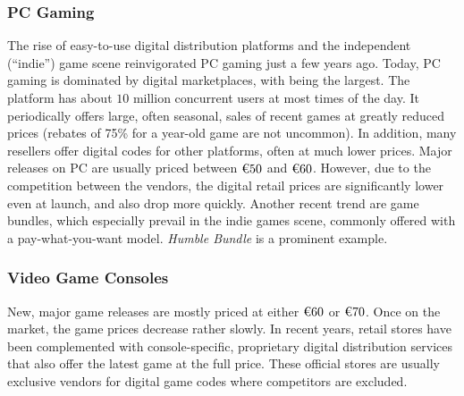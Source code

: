 \subsubsection{\gls{PC} Gaming}
\label{sec:pcgaming}

The rise of easy-to-use digital distribution platforms and the
independent (``indie'') game scene reinvigorated \gls{PC} gaming just a few
years ago. Today, \gls{PC} gaming is dominated by digital marketplaces,
with \steam being the largest. The platform has about $10$ million
concurrent users at most times of the day. It periodically offers large,
often seasonal, sales of recent games at greatly reduced prices (rebates
of 75\% for a year-old game are not uncommon). In addition, many
resellers offer digital codes for other platforms, often at much lower
prices.
Major releases on PC are usually priced between $\text{\texteuro} 50$
and $\text{\texteuro} 60$. However, due to the competition between the
vendors, the digital retail prices are significantly lower even at
launch, and also drop more quickly. Another recent trend are game
bundles, which especially prevail in the indie games scene, commonly
offered with a pay-what-you-want model. \textit{Humble
Bundle} is a prominent
example.






\subsubsection{Video Game Consoles}

New, major game releases are mostly priced at either
$\text{\texteuro} 60$ or $\text{\texteuro} 70$. Once on the market, the
game prices decrease rather slowly. In recent years, retail stores have
been complemented with console-specific, proprietary digital
distribution services that also offer the latest game at the full price.
These official stores are usually exclusive vendors for digital game
codes where competitors are excluded.

